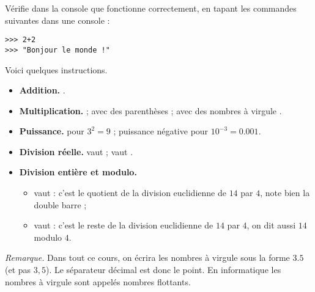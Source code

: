 \documentclass[11pt,class=report,crop=false]{standalone}
\begin{document}












\begin{cours}

Vérifie dans la console que \Python{} fonctionne correctement, en tapant les commandes suivantes dans une console \Python{} :
\begin{lstlisting}
>>> 2+2
>>> "Bonjour le monde !"
\end{lstlisting}

Voici quelques instructions.
\begin{itemize}
  \item \textbf{Addition.} .
  \item \textbf{Multiplication.} 
   ; avec des parenthèses  ; avec des nombres à virgule .
  \item \textbf{Puissance.}  pour $3^2=9$ ; puissance négative  pour $10^{-3} = 0.001$.
  \item \textbf{Division réelle.}  vaut  ;  vaut .
  \item \textbf{Division entière et modulo.}
  \begin{itemize}
    \item {} vaut  : c'est le quotient de la division euclidienne de $14$ par $4$, note bien la double barre ;
    \item {} vaut  : c'est le reste de la division euclidienne de $14$ par $4$, on dit aussi \og{}$14$ modulo $4$\fg.
  \end{itemize}
\end{itemize}

\emph{Remarque.} Dans tout ce cours, on écrira les \og{}nombres à virgule\fg{} sous la forme $3.5$ (et pas $3,5$). Le séparateur décimal est donc le point. En informatique les nombres à virgule sont appelés \og{}nombres flottants\fg{}.
\end{cours}
\end{document}
